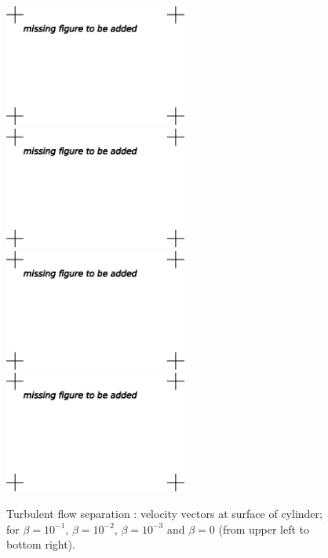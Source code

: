 \begin{figure}
\centering
\includegraphics[height=4cm]{chapters/hoffman-1/eps/Hoffman_fig2a.eps}
\includegraphics[height=4cm]{chapters/hoffman-1/eps/Hoffman_fig2b.eps}
\includegraphics[height=4cm]{chapters/hoffman-1/eps/Hoffman_fig2c.eps}
\includegraphics[height=4cm]{chapters/hoffman-1/eps/Hoffman_fig2d.eps}
\caption{Turbulent flow separation  \cite{JanssonHoffman2009}: velocity vectors at surface of cylinder; for $\beta = 10^{-1}$, $\beta = 10^{-2}$, $\beta = 10^{-3}$ and $\beta = 0$ (from upper left to bottom right).}
\label{fig:1}
\end{figure}

